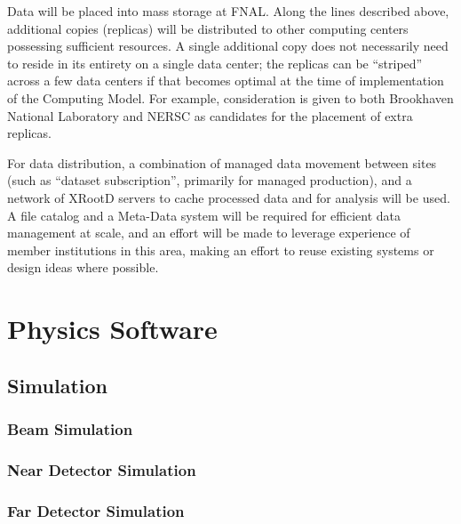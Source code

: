 Data will be placed into mass storage at FNAL. Along the lines described above, additional copies (replicas) will be distributed to other
computing centers possessing sufficient resources.
A single additional copy does not necessarily need to reside in its entirety on a single data center; the replicas can be ``striped'' across a few data centers if that
becomes optimal at the time of implementation of the Computing Model. For example, consideration is given to both Brookhaven National Laboratory
and NERSC as candidates for the placement of extra replicas.

For data distribution, a combination of managed data movement between sites (such as ``dataset subscription'',
primarily for managed production), and a network of XRootD servers to cache processed data and for analysis will be used.
A file catalog and a Meta-Data system will be required for efficient data management at scale, and an effort will be made to leverage experience of
member institutions in this area, making an effort to reuse existing systems or design ideas where possible.


\section{Physics Software}
\label{sec:detectors-sc-physics-software}




\subsection{Simulation}
\label{sec:detectors-sc-physics-software-simulation}

\subsubsection{Beam Simulation}
\label{sec:detectors-sc-physics-software-simulation-beam}

\subsubsection{Near Detector Simulation}
\label{sec:detectors-sc-physics-software-simulation-nd}

\subsubsection{Far Detector Simulation}
\label{sec:detectors-sc-physics-software-simulation-fd}

